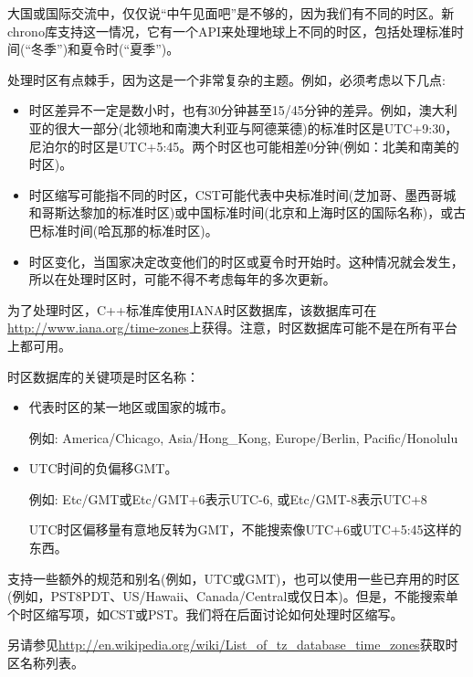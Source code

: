 

大国或国际交流中，仅仅说“中午见面吧”是不够的，因为我们有不同的时区。新chrono库支持这一情况，它有一个API来处理地球上不同的时区，包括处理标准时间(“冬季”)和夏令时(“夏季”)。


处理时区有点棘手，因为这是一个非常复杂的主题。例如，必须考虑以下几点:

\begin{itemize}
\item
时区差异不一定是数小时，也有30分钟甚至15/45分钟的差异。例如，澳大利亚的很大一部分(北领地和南澳大利亚与阿德莱德)的标准时区是UTC+9:30，尼泊尔的时区是UTC+5:45。两个时区也可能相差0分钟(例如：北美和南美的时区)。

\item
时区缩写可能指不同的时区，CST可能代表中央标准时间(芝加哥、墨西哥城和哥斯达黎加的标准时区)或中国标准时间(北京和上海时区的国际名称)，或古巴标准时间(哈瓦那的标准时区)。

\item
时区变化，当国家决定改变他们的时区或夏令时开始时。这种情况就会发生，所以在处理时区时，可能不得不考虑每年的多次更新。
\end{itemize}


为了处理时区，C++标准库使用IANA时区数据库，该数据库可在\url{http://www.iana.org/time-zones}上获得。注意，时区数据库可能不是在所有平台上都可用。

时区数据库的关键项是时区名称：

\begin{itemize}
\item
代表时区的某一地区或国家的城市。

例如: America/Chicago, Asia/Hong\_Kong, Europe/Berlin, Pacific/Honolulu

\item
UTC时间的负偏移GMT。

例如: Etc/GMT或Etc/GMT+6表示UTC-6, 或Etc/GMT-8表示UTC+8

UTC时区偏移量有意地反转为GMT，不能搜索像UTC+6或UTC+5:45这样的东西。
\end{itemize}

支持一些额外的规范和别名(例如，UTC或GMT)，也可以使用一些已弃用的时区(例如，PST8PDT、US/Hawaii、Canada/Central或仅日本)。但是，不能搜索单个时区缩写项，如CST或PST。我们将在后面讨论如何处理时区缩写。

另请参见\url{http://en.wikipedia.org/wiki/List_of_tz_database_time_zones}获取时区名称列表。


